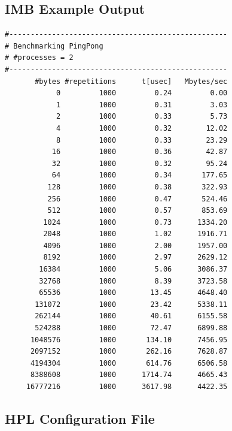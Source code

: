 \documentclass{article}
\begin{document}
    \clearpage

    \subsection{IMB Example Output}
        \label{appendix:imb-example-output}

        \begin{verbatim}
#---------------------------------------------------
# Benchmarking PingPong
# #processes = 2
#---------------------------------------------------
       #bytes #repetitions      t[usec]   Mbytes/sec
            0         1000         0.24         0.00
            1         1000         0.31         3.03
            2         1000         0.33         5.73
            4         1000         0.32        12.02
            8         1000         0.33        23.29
           16         1000         0.36        42.87
           32         1000         0.32        95.24
           64         1000         0.34       177.65
          128         1000         0.38       322.93
          256         1000         0.47       524.46
          512         1000         0.57       853.69
         1024         1000         0.73      1334.20
         2048         1000         1.02      1916.71
         4096         1000         2.00      1957.00
         8192         1000         2.97      2629.12
        16384         1000         5.06      3086.37
        32768         1000         8.39      3723.58
        65536         1000        13.45      4648.40
       131072         1000        23.42      5338.11
       262144         1000        40.61      6155.58
       524288         1000        72.47      6899.88
      1048576         1000       134.10      7456.95
      2097152         1000       262.16      7628.87
      4194304         1000       614.76      6506.58
      8388608         1000      1714.74      4665.43
     16777216         1000      3617.98      4422.35
        \end{verbatim}

    \clearpage

    \subsection{HPL Configuration File}
        \label{appendix:hpl-conf}
\end{document}

